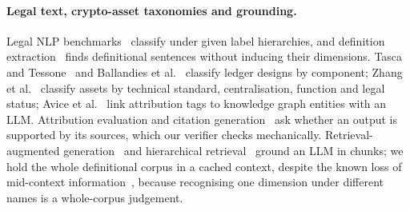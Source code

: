 \paragraph{Legal text, crypto-asset taxonomies and grounding.}
Legal NLP benchmarks~\cite{chalkidis2021multieurlex,chalkidis2022lexglue}
classify under given label hierarchies, and definition
extraction~\cite{spala2020deft} finds definitional sentences without inducing
their dimensions. Tasca and Tessone~\cite{tasca2019taxonomy} and Ballandies et
al.~\cite{ballandies2022decrypting} classify ledger designs by component; Zhang et al.~\cite{zhang2026cryptotaxonomy} classify assets by
technical standard, centralisation, function and legal status; Avice et al.~\cite{cryptotags2024} link attribution tags to knowledge graph entities with
an LLM. Attribution evaluation and citation generation~\cite{rashkin2023ais,
gao2023alce,liu2023verifiability} ask whether an output is supported by its
sources, which our verifier checks mechanically. Retrieval-augmented
generation~\cite{lewis2020rag} and hierarchical retrieval~\cite{sarthi2024raptor}
ground an LLM in chunks; we hold the whole definitional corpus in a cached
context, despite the known loss of mid-context information~\cite{liu2024lost},
because recognising one dimension under different names is a whole-corpus
judgement.

